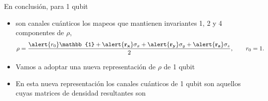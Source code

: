 \documentclass[11pt,xcolor=dvipsnames]{beamer}
\begin{document}
\begin{frame}{En conclusión, para 1 qubit}
	\begin{itemize}[label=$\textcolor{Blue}{\blacktriangleright}$]
		\item son canales cuánticos los mapeos que mantienen
						invariantes 1, 2 y 4 componentes de $\rho$,
		\begin{align*}
			\rho = \frac{\alert{r_0}\mathbb{1} + \alert{\mathbf{r_x}}\sigma _x 
			+ \alert{\mathbf{r_y}}\sigma _y	+ \alert{\mathbf{r_z}}\sigma _z}{2}, 
			\hspace{20pt} r_0 = 1.
		\end{align*}					
	\end{itemize}
	
	
\end{frame}




\begin{frame}
	\begin{itemize}[label=$\textcolor{Blue}{\blacktriangleright}$]
		\item<1-> Vamos a adoptar una nueva representación de $\rho$ de 1 qubit 
		\begin{figure}
			\centering
		\end{figure}
		\item<2-> En esta nueva representación los canales cuánticos de 1 qubit
		son aquellos cuyas matrices de densidad resultantes son
		\vspace{0.7cm}
		\begin{center}
		\end{center}
	\end{itemize}
\end{frame}
\end{document}
